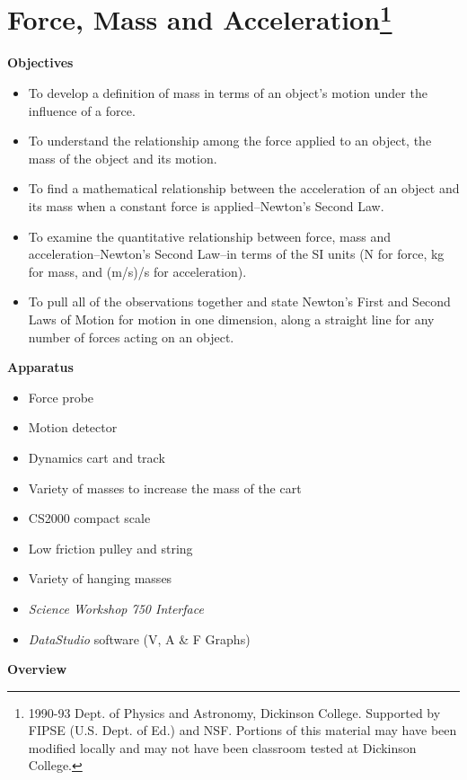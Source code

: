 
\section{Force, Mass and Acceleration\footnote{
1990-93 Dept. of Physics and Astronomy, Dickinson College. Supported by FIPSE
(U.S. Dept. of Ed.) and NSF. Portions of this material may have been modified
locally and may not have been classroom tested at Dickinson College.
}}

\makelabheader %

\textbf{Objectives }

\begin{itemize}
\item To develop a definition of mass in terms of an object's motion under the influence
of a force. 
\item To understand the relationship among the force applied to an object, the mass
of the object and its motion. 
\item To find a mathematical relationship between the acceleration of an object and
its mass when a constant force is applied--Newton's Second Law. 
\item To examine the quantitative relationship between force, mass and acceleration--Newton's
Second Law--in terms of the SI units (N for force, kg for mass, and (m/s)/s for
acceleration). 
\item To pull all of the observations together and state Newton's First and Second
Laws of Motion for motion in one dimension, along a straight line for any number
of forces acting on an object.
\end{itemize}
\textbf{Apparatus }

\begin{itemize}
\item Force probe 
\item Motion detector 
\item Dynamics cart and track 
\item Variety of masses to increase the mass of the cart 
\item CS2000 compact scale
\item Low friction pulley and string 
\item Variety of hanging masses 
\item \textit{Science Workshop 750 Interface }
\item \textit{DataStudio} software (V, A \& F Graphs)
\end{itemize}
\textbf{Overview }

